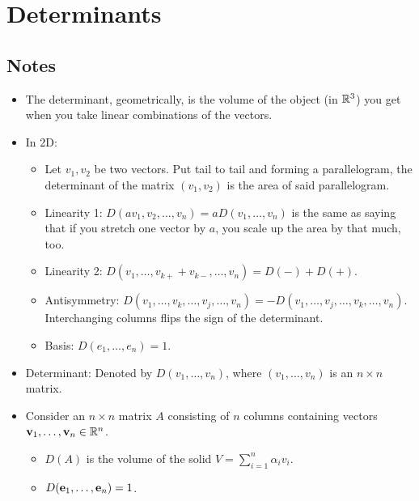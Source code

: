 \documentclass[../../notes.tex]{subfiles}
\begin{document}
\chapter{Determinants}
\section{Notes}
\begin{itemize}
    \item {}The determinant, geometrically, is the volume of the object (in $\mathbb{R}^3$) you get when you take linear combinations of the vectors.
    \item In 2D:
    \begin{itemize}
        \item Let $v_1,v_2$ be two vectors. Put tail to tail and forming a parallelogram, the determinant of the matrix $(v_1,v_2)$ is the area of said parallelogram.
        \item Linearity 1: $D(av_1,v_2,\dots,v_n)=aD(v_1,\dots,v_n)$ is the same as saying that if you stretch one vector by $a$, you scale up the area by that much, too.
        \item Linearity 2: $D(v_1,\dots,v_{k+}+v_{k-},\dots,v_n)=D(-)+D(+)$.
        \item Antisymmetry: $D(v_1,\dots,v_k,\dots,v_j,\dots,v_n)=-D(v_1,\dots,v_j,\dots,v_k,\dots,v_n)$. Interchanging columns flips the sign of the determinant.
        \item Basis: $D(e_1,\dots,e_n)=1$.
    \end{itemize}
    \item Determinant: Denoted by $D(v_1,\dots,v_n)$, where $(v_1,\dots,v_n)$ is an $n\times n$ matrix.
    \item {}Consider an $n\times n$ matrix $A$ consisting of $n$ columns containing vectors $\mathbf{v}_1,\dots,\mathbf{v}_n\in\mathbb{R}^n$.
    \begin{itemize}
        \item $D(A)$ is the volume of the solid $V=\sum_{i=1}^n\alpha_iv_i$.
        \item $D(\mathbf{e}_1,\dots,\mathbf{e}_n)=1$.
    \end{itemize}
    \begin{figure}[h!]
        \centering
        \footnotesize
        \begin{subfigure}[b]{0.45\linewidth}
            \centering
\end{subfigure}
\end{figure}
\end{itemize}
\end{document}
